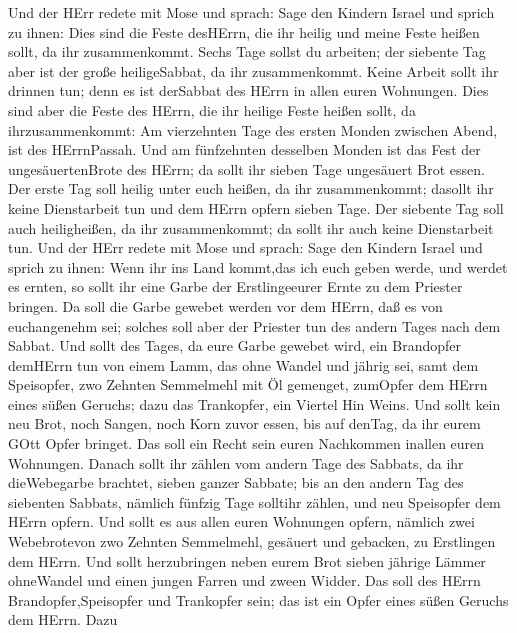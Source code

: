 Und der HErr redete mit Mose und sprach:  Sage
den Kindern Israel und sprich zu ihnen: Dies sind die Feste desHErrn,
die ihr heilig und meine Feste heißen sollt, da ihr zusammenkommt.
 Sechs Tage sollst du arbeiten; der siebente Tag aber ist
der große heiligeSabbat, da ihr zusammenkommt. Keine Arbeit sollt ihr
drinnen tun; denn es ist derSabbat des HErrn in allen euren Wohnungen.
 Dies sind aber die Feste des HErrn, die ihr heilige Feste
heißen sollt, da ihrzusammenkommt:  Am vierzehnten Tage des
ersten Monden zwischen Abend, ist des HErrnPassah.  Und am
fünfzehnten desselben Monden ist das Fest der ungesäuertenBrote des
HErrn; da sollt ihr sieben Tage ungesäuert Brot essen.  Der
erste Tag soll heilig unter euch heißen, da ihr zusammenkommt; dasollt
ihr keine Dienstarbeit tun  und dem HErrn opfern sieben
Tage. Der siebente Tag soll auch heiligheißen, da ihr zusammenkommt; da
sollt ihr auch keine Dienstarbeit tun.  Und der HErr redete
mit Mose und sprach:  Sage den Kindern Israel und sprich zu
ihnen: Wenn ihr ins Land kommt,das ich euch geben werde, und werdet es
ernten, so sollt ihr eine Garbe der Erstlingeeurer Ernte zu dem Priester
bringen.  Da soll die Garbe gewebet werden vor dem HErrn,
daß es von euchangenehm sei; solches soll aber der Priester tun des
andern Tages nach dem Sabbat.  Und sollt des Tages, da eure
Garbe gewebet wird, ein Brandopfer demHErrn tun von einem Lamm, das ohne
Wandel und jährig sei,  samt dem Speisopfer, zwo Zehnten
Semmelmehl mit Öl gemenget, zumOpfer dem HErrn eines süßen Geruchs; dazu
das Trankopfer, ein Viertel Hin Weins.  Und sollt kein neu
Brot, noch Sangen, noch Korn zuvor essen, bis auf denTag, da ihr eurem
GOtt Opfer bringet. Das soll ein Recht sein euren Nachkommen inallen
euren Wohnungen.  Danach sollt ihr zählen vom andern Tage
des Sabbats, da ihr dieWebegarbe brachtet, sieben ganzer Sabbate;
 bis an den andern Tag des siebenten Sabbats, nämlich
fünfzig Tage solltihr zählen, und neu Speisopfer dem HErrn opfern.
 Und sollt es aus allen euren Wohnungen opfern, nämlich
zwei Webebrotevon zwo Zehnten Semmelmehl, gesäuert und gebacken, zu
Erstlingen dem HErrn.  Und sollt herzubringen neben eurem
Brot sieben jährige Lämmer ohneWandel und einen jungen Farren und zween
Widder. Das soll des HErrn Brandopfer,Speisopfer und Trankopfer sein;
das ist ein Opfer eines süßen Geruchs dem HErrn.  Dazu
